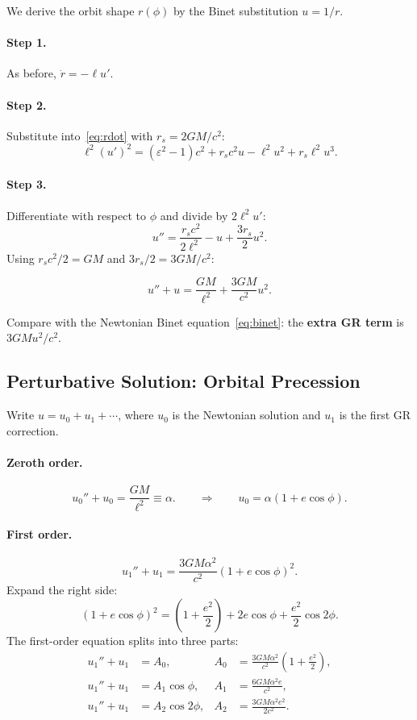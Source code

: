 \documentclass[12pt,a4paper]{article}
\theoremstyle{plain}
\theoremstyle{definition}
\theoremstyle{remark}
\newcommand{\leff}{\ell}  %
\begin{document}
We derive the orbit shape $r(\phi)$ by the Binet substitution $u=1/r$.

\paragraph{Step 1.} As before, $\dot r = -\leff u'$.

\paragraph{Step 2.} Substitute into~\eqref{eq:rdot} with $r_s=2GM/c^2$:
\[
  \leff^2(u')^2 = (\varepsilon^2-1)c^2 + r_s c^2 u - \leff^2 u^2 + r_s\leff^2 u^3.
\]

\paragraph{Step 3.} Differentiate with respect to $\phi$ and divide by $2\leff^2 u'$:
\[
  u'' = \frac{r_s c^2}{2\leff^2} - u + \frac{3r_s}{2}u^2.
\]
Using $r_s c^2/2 = GM$ and $3r_s/2 = 3GM/c^2$:

\begin{equation}\label{eq:GR-orbit}
  \boxed{u'' + u = \frac{GM}{\leff^2} + \frac{3GM}{c^2}u^2.}
\end{equation}

Compare with the Newtonian Binet equation~\eqref{eq:binet}: the \textbf{extra GR term} is $3GMu^2/c^2$.

\subsection{Perturbative Solution: Orbital Precession}

Write $u = u_0 + u_1 + \cdots$, where $u_0$ is the Newtonian solution and $u_1$ is the first GR correction.

\paragraph{Zeroth order.}
\[
  u_0''+u_0 = \frac{GM}{\leff^2}\equiv\alpha.
  \qquad\Rightarrow\qquad
  u_0 = \alpha(1+e\cos\phi).
\]

\paragraph{First order.}
\[
  u_1''+u_1 = \frac{3GM\alpha^2}{c^2}(1+e\cos\phi)^2.
\]
Expand the right side:
\[
  (1+e\cos\phi)^2 = \left(1+\frac{e^2}{2}\right) + 2e\cos\phi + \frac{e^2}{2}\cos 2\phi.
\]
The first-order equation splits into three parts:
\begin{align}
  u_1''+u_1 &= A_0, & A_0 &= \frac{3GM\alpha^2}{c^2}\!\left(1+\frac{e^2}{2}\right), \label{eq:part1}\\
  u_1''+u_1 &= A_1\cos\phi, & A_1 &= \frac{6GM\alpha^2 e}{c^2}, \label{eq:part2}\\
  u_1''+u_1 &= A_2\cos 2\phi, & A_2 &= \frac{3GM\alpha^2 e^2}{2c^2}. \label{eq:part3}
\end{align}
\end{document}

